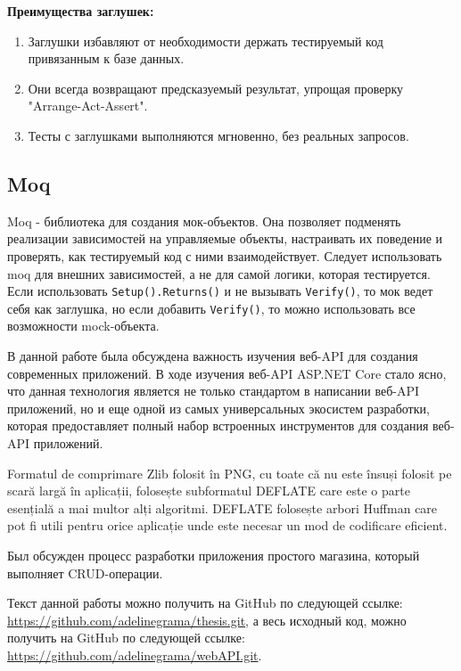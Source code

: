 \documentclass[a4paper,12pt]{report}
\newcommand{\githubthesis}{\url{https://github.com/adelinegrama/thesis.git}}
\newcommand{\githubwebAPI}{\url{https://github.com/adelinegrama/webAPI.git}}
\begin{document}
\textbf{Преимущества заглушек:}
\begin{enumerate}
    \item
        Заглушки избавляют от необходимости держать тестируемый код привязанным к базе данных.
    \item
        Они всегда возвращают предсказуемый результат, упрощая проверку "Arrange-Act-Assert".
    \item
        Тесты с заглушками выполняются мгновенно, без реальных запросов.
\end{enumerate}

\subsection{Moq}

Moq - библиотека для создания мок-объектов. Она позволяет подменять реализации зависимостей на управляемые объекты, 
настраивать их поведение и проверять, как тестируемый код с ними взаимодействует. Следует использовать moq для внешних зависимостей, 
а не для самой логики, которая тестируется. Если использовать \texttt{Setup().Returns()} и не вызывать \texttt{Verify()}, то мок ведет себя как заглушка, 
но если добавить \texttt{Verify()}, то можно использовать все возможности mock-объекта. 

    

В данной работе была обсуждена важность изучения веб-\acs{API} для создания современных приложений. 
В ходе изучения веб-\acs{API} ASP.NET Core стало ясно, что данная технология является не только стандартом 
в написании веб-\acs{API} приложений, но и еще одной из самых универсальных экосистем разработки, которая 
предоставляет полный набор встроенных инструментов для создания веб-\acs{API} приложений.

Formatul de comprimare Zlib folosit în \ac{PNG},
cu toate că nu este însuși folosit pe scară largă în aplicații,
folosește subformatul DEFLATE care este o parte esențială a mai multor alți algoritmi.
DEFLATE folosește arbori Huffman care pot fi utili pentru orice aplicație
unde este necesar un mod de codificare eficient.

Был обсужден процесс разработки приложения простого магазина, который выполняет \acs{CRUD}-операции. 


Текст данной работы можно получить на GitHub по следующей ссылке: \githubthesis, 
а весь исходный код, можно получить на GitHub по следующей ссылке: \githubwebAPI.
\end{document}
